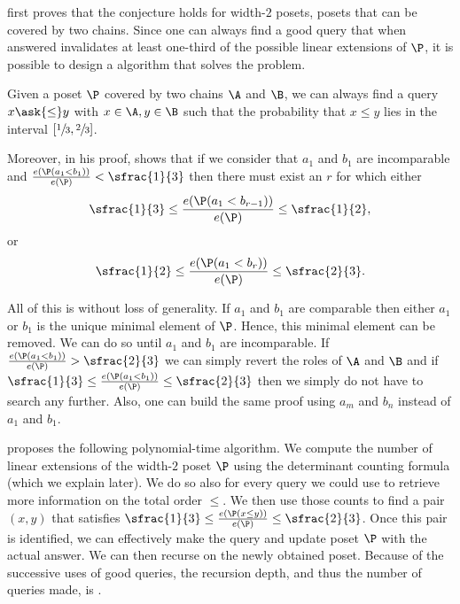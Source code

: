 \citet*{linial:1984} first proves that the \onethirdtwothird conjecture holds
for width-\(2\) posets, \ie posets that can be covered by two chains. Since one
can always find a good query that when answered invalidates at
least one-third of the possible linear extensions of \(\P\), it is possible to design a
 algorithm that solves the \MUPI problem.
\begin{theorem}
Given a poset \(\P\) covered by two chains \(\A\) and \(\B\), we can always find
a query \(x \ask{\le} y\) with \(x \in \A, y \in \B\) such that the probability
that \(x \le y\) lies in the interval \([\sfrac{1}{3}, \sfrac{2}{3}]\).
\end{theorem}

Moreover, in his proof, \citet*{linial:1984} shows that if we consider that \(
a_1\) and \(b_1\) are incomparable and \(\frac{e(\P(a_1 < b_1))}{e(\P)} <
\sfrac{1}{3}\) then there must exist an \(r\) for which either
\begin{displaymath}
\sfrac{1}{3} \le \frac{e(\P(a_1 < b_{r-1}))}{e(\P)} \le \sfrac{1}{2},
\end{displaymath}
or
\begin{displaymath}
\sfrac{1}{2} \le \frac{e(\P(a_1 < b_{r}))}{e(\P)} \le \sfrac{2}{3}.
\end{displaymath}

All of this is without loss of generality. If \(a_1\) and \(b_1\) are
comparable then either \(a_1\) or \(b_1\) is the unique minimal element of \(\P\).
Hence, this minimal element can be removed. We can do so
until \(a_1\) and \(b_1\) are incomparable. If \(\frac{e(\P(a_1 < b_1))}{e(\P)} >
\sfrac{2}{3}\) we can simply revert the roles of \(\A\) and \(\B\) and if
\(\sfrac{1}{3} \le \frac{e(\P(a_1 < b_1))}{e(\P)} \le \sfrac{2}{3}\) then we
simply do not have to search any further. Also, one can build the same
proof using \(a_m\) and \(b_n\) instead of \(a_1\) and \(b_1\).

\citet*{linial:1984} proposes the following polynomial-time algorithm. We
compute the number of linear extensions of the width-\(2\) poset \(\P\) using
the determinant counting formula (which we explain later). We do so also for every query we could use to
retrieve more information on the total order \(\le\). We then use those counts
to find a pair \((x,y)\) that satisfies \(\sfrac{1}{3} \le \frac{e(\P(x \le
y))}{e(\P)} \le \sfrac{2}{3}\). Once this pair is
identified, we can effectively make the query and update poset \(\P\) with the
actual answer. We can then recurse on the newly obtained poset. Because of the
successive uses of good queries, the recursion depth, and thus the number of
queries made, is .

